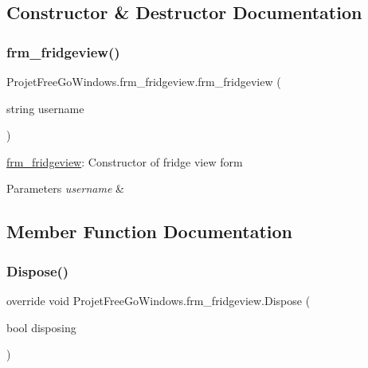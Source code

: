 \subsection{Constructor \& Destructor Documentation}
\mbox{\label{class_projet_free_go_windows_1_1frm__fridgeview_afd443a535fe33fc18661498c9103c3ee}} 
\subsubsection{\texorpdfstring{frm\+\_\+fridgeview()}{frm\_fridgeview()}}
{\footnotesize\ttfamily Projet\+Free\+Go\+Windows.\+frm\+\_\+fridgeview.\+frm\+\_\+fridgeview (\begin{DoxyParamCaption}\item[{string}]{username }\end{DoxyParamCaption})}



\hyperlink{class_projet_free_go_windows_1_1frm__fridgeview}{frm\+\_\+fridgeview}\+: Constructor of fridge view form 


\begin{DoxyParams}{Parameters}
{\em username} & \\
\hline
\end{DoxyParams}


\subsection{Member Function Documentation}
\mbox{\label{class_projet_free_go_windows_1_1frm__fridgeview_ad76475628c30fdf4d69041ae0b660323}} 
\subsubsection{\texorpdfstring{Dispose()}{Dispose()}}
{\footnotesize\ttfamily override void Projet\+Free\+Go\+Windows.\+frm\+\_\+fridgeview.\+Dispose (\begin{DoxyParamCaption}\item[{bool}]{disposing }\end{DoxyParamCaption})\hspace{0.3cm}{\ttfamily [protected]}}




